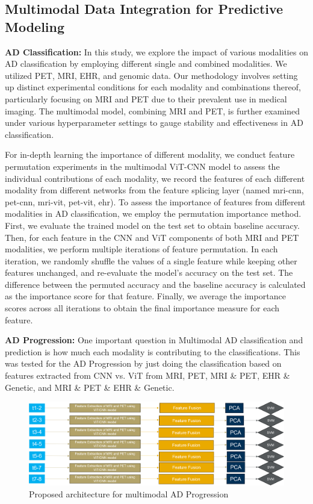 \subsection{Multimodal Data Integration for Predictive Modeling}
\textbf{AD Classification: } In this study, we explore the impact of various modalities on AD classification by employing different single and combined modalities. We utilized PET, MRI, EHR, and genomic data. Our methodology involves setting up distinct experimental conditions for each modality and combinations thereof, particularly focusing on MRI and PET due to their prevalent use in medical imaging. The multimodal model, combining MRI and PET, is further examined under various hyperparameter settings to gauge stability and effectiveness in AD classification. 

For in-depth learning the importance of different modality, we conduct feature permutation experiments in the multimodal ViT-CNN model to assess the individual contributions of each modality, we record the features of each different modality from different networks from the feature splicing layer (named mri-cnn, pet-cnn, mri-vit, pet-vit, ehr). To assess the importance of features from different modalities in AD classification, we employ the permutation importance method. First, we evaluate the trained model on the test set to obtain baseline accuracy. Then, for each feature in the CNN and ViT components of both MRI and PET modalities, we perform multiple iterations of feature permutation. In each iteration, we randomly shuffle the values of a single feature while keeping other features unchanged, and re-evaluate the model's accuracy on the test set. The difference between the permuted accuracy and the baseline accuracy is calculated as the importance score for that feature. Finally, we average the importance scores across all iterations to obtain the final importance measure for each feature. 

\textbf{AD Progression: } One important question in Multimodal AD classification and prediction is how much each modality is contributing to the classifications. This was tested for the AD Progression by just doing the classification based on features extracted from CNN vs. ViT from MRI, PET, MRI \& PET, EHR \& Genetic, and MRI \& PET \& EHR \& Genetic.
\begin{figure}
    \centering
    \includegraphics[width=1\linewidth]{figs/Picture14.png}
    \caption{Proposed architecture for multimodal AD Progression }
    \label{fig:enter-label}
\end{figure}
